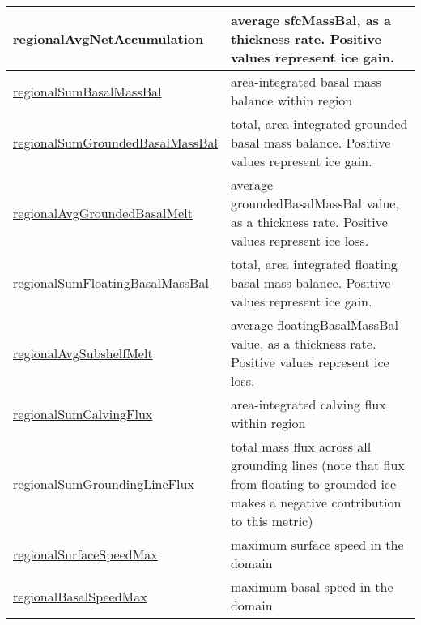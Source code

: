 {\begin{center}
\begin{longtable}{| p{2.0in} | p{4.0in} |}
    \hline
    \hyperref[subsec:var_sec_regionalStatsAM_regionalAvgNetAccumulation]{regionalAvgNetAccumulation} & average sfcMassBal, as a thickness rate. Positive values represent ice gain. \\
    \hline
    \hyperref[subsec:var_sec_regionalStatsAM_regionalSumBasalMassBal]{regionalSumBasalMassBal} & area-integrated basal mass balance within region \\
    \hline
    \hyperref[subsec:var_sec_regionalStatsAM_regionalSumGroundedBasalMassBal]{regionalSumGroundedBasalMass\-Bal} & total, area integrated grounded basal mass balance. Positive values represent ice gain. \\
    \hline
    \hyperref[subsec:var_sec_regionalStatsAM_regionalAvgGroundedBasalMelt]{regionalAvgGroundedBasalMelt} & average groundedBasalMassBal value, as a thickness rate. Positive values represent ice loss. \\
    \hline
    \hyperref[subsec:var_sec_regionalStatsAM_regionalSumFloatingBasalMassBal]{regionalSumFloatingBasalMass\-Bal} & total, area integrated floating basal mass balance. Positive values represent ice gain. \\
    \hline
    \hyperref[subsec:var_sec_regionalStatsAM_regionalAvgSubshelfMelt]{regionalAvgSubshelfMelt} & average floatingBasalMassBal value, as a thickness rate. Positive values represent ice loss. \\
    \hline
    \hyperref[subsec:var_sec_regionalStatsAM_regionalSumCalvingFlux]{regionalSumCalvingFlux} & area-integrated calving flux within region \\
    \hline
    \hyperref[subsec:var_sec_regionalStatsAM_regionalSumGroundingLineFlux]{regionalSumGroundingLineFlux} & total mass flux across all grounding lines (note that flux from floating to grounded ice makes a negative contribution to this metric) \\
    \hline
    \hyperref[subsec:var_sec_regionalStatsAM_regionalSurfaceSpeedMax]{regionalSurfaceSpeedMax} & maximum surface speed in the domain \\
    \hline
    \hyperref[subsec:var_sec_regionalStatsAM_regionalBasalSpeedMax]{regionalBasalSpeedMax} & maximum basal speed in the domain \\
    \hline
\end{longtable}
\end{center}
}
